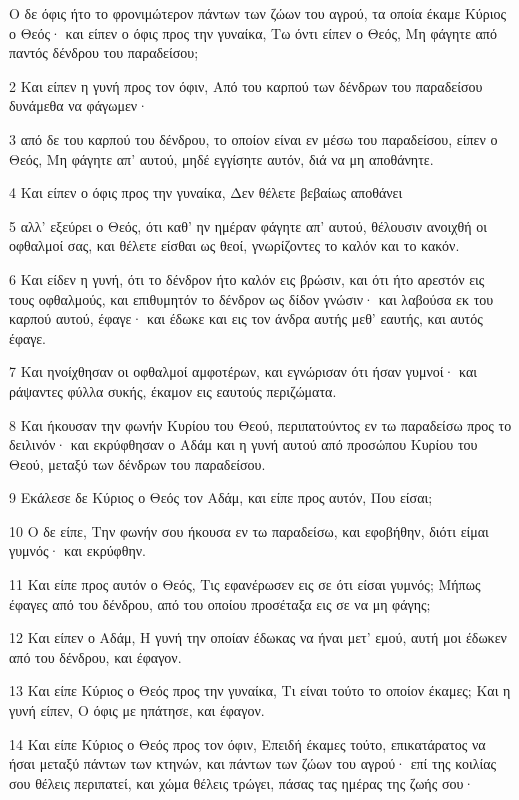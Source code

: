 \par Ο δε όφις ήτο το φρονιμώτερον πάντων των ζώων του αγρού, τα οποία έκαμε Κύριος ο Θεός· και είπεν ο όφις προς την γυναίκα, Τω όντι είπεν ο Θεός, Μη φάγητε από παντός δένδρου του παραδείσου;
\par 2 Και είπεν η γυνή προς τον όφιν, Από του καρπού των δένδρων του παραδείσου δυνάμεθα να φάγωμεν·
\par 3 από δε του καρπού του δένδρου, το οποίον είναι εν μέσω του παραδείσου, είπεν ο Θεός, Μη φάγητε απ' αυτού, μηδέ εγγίσητε αυτόν, διά να μη αποθάνητε.
\par 4 Και είπεν ο όφις προς την γυναίκα, Δεν θέλετε βεβαίως αποθάνει
\par 5 αλλ' εξεύρει ο Θεός, ότι καθ' ην ημέραν φάγητε απ' αυτού, θέλουσιν ανοιχθή οι οφθαλμοί σας, και θέλετε είσθαι ως θεοί, γνωρίζοντες το καλόν και το κακόν.
\par 6 Και είδεν η γυνή, ότι το δένδρον ήτο καλόν εις βρώσιν, και ότι ήτο αρεστόν εις τους οφθαλμούς, και επιθυμητόν το δένδρον ως δίδον γνώσιν· και λαβούσα εκ του καρπού αυτού, έφαγε· και έδωκε και εις τον άνδρα αυτής μεθ' εαυτής, και αυτός έφαγε.
\par 7 Και ηνοίχθησαν οι οφθαλμοί αμφοτέρων, και εγνώρισαν ότι ήσαν γυμνοί· και ράψαντες φύλλα συκής, έκαμον εις εαυτούς περιζώματα.
\par 8 Και ήκουσαν την φωνήν Κυρίου του Θεού, περιπατούντος εν τω παραδείσω προς το δειλινόν· και εκρύφθησαν ο Αδάμ και η γυνή αυτού από προσώπου Κυρίου του Θεού, μεταξύ των δένδρων του παραδείσου.
\par 9 Εκάλεσε δε Κύριος ο Θεός τον Αδάμ, και είπε προς αυτόν, Που είσαι;
\par 10 Ο δε είπε, Την φωνήν σου ήκουσα εν τω παραδείσω, και εφοβήθην, διότι είμαι γυμνός· και εκρύφθην.
\par 11 Και είπε προς αυτόν ο Θεός, Τις εφανέρωσεν εις σε ότι είσαι γυμνός; Μήπως έφαγες από του δένδρου, από του οποίου προσέταξα εις σε να μη φάγης;
\par 12 Και είπεν ο Αδάμ, Η γυνή την οποίαν έδωκας να ήναι μετ' εμού, αυτή μοι έδωκεν από του δένδρου, και έφαγον.
\par 13 Και είπε Κύριος ο Θεός προς την γυναίκα, Τι είναι τούτο το οποίον έκαμες; Και η γυνή είπεν, Ο όφις με ηπάτησε, και έφαγον.
\par 14 Και είπε Κύριος ο Θεός προς τον όφιν, Επειδή έκαμες τούτο, επικατάρατος να ήσαι μεταξύ πάντων των κτηνών, και πάντων των ζώων του αγρού· επί της κοιλίας σου θέλεις περιπατεί, και χώμα θέλεις τρώγει, πάσας τας ημέρας της ζωής σου·
